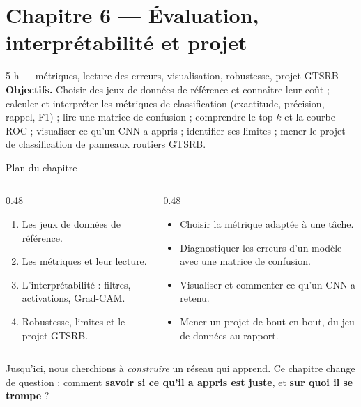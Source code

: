 \section{Chapitre 6 --- Évaluation, interprétabilité et projet}

%
{5 h --- métriques, lecture des erreurs, visualisation, robustesse, projet GTSRB}%
{\textbf{Objectifs.} Choisir des jeux de données de référence et connaître leur coût ;
calculer et interpréter les métriques de classification (exactitude, précision, rappel, F1) ;
lire une matrice de confusion ; comprendre le top-$k$ et la courbe ROC ; visualiser ce
qu'un CNN a appris ; identifier ses limites ; mener le projet de classification de
panneaux routiers GTSRB.}

\begin{frame}{Plan du chapitre}
\begin{columns}[t]
\begin{column}{0.48\textwidth}
\begin{kbox}
\begin{enumerate}
  \item Les jeux de données de référence.
  \item Les métriques et leur lecture.
  \item L'interprétabilité : filtres, activations, Grad-CAM.
  \item Robustesse, limites et le projet GTSRB.
\end{enumerate}
\end{kbox}
\end{column}
\begin{column}{0.48\textwidth}
\begin{ebox}
\begin{itemize}
  \item Choisir la métrique adaptée à une tâche.
  \item Diagnostiquer les erreurs d'un modèle avec une matrice de confusion.
  \item Visualiser et commenter ce qu'un CNN a retenu.
  \item Mener un projet de bout en bout, du jeu de données au rapport.
\end{itemize}
\end{ebox}
\end{column}
\end{columns}
\vspace{1mm}
\begin{wbox}
Jusqu'ici, nous cherchions à \emph{construire} un réseau qui apprend. Ce chapitre
change de question : comment \textbf{savoir si ce qu'il a appris est juste}, et
\textbf{sur quoi il se trompe} ?
\end{wbox}
\end{frame}

